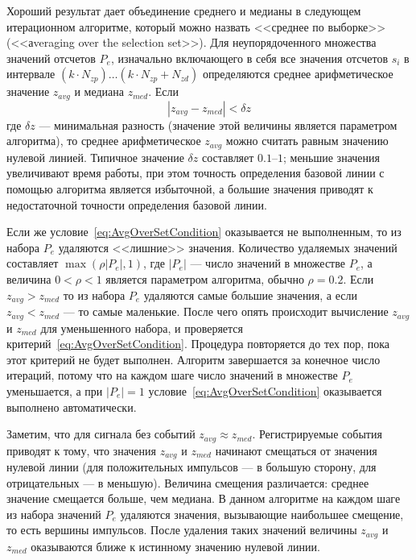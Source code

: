 Хороший результат дает объединение среднего и медианы в следующем итерационном алгоритме, который можно назвать <<среднее по выборке>> (<<аveraging over the selection set>>). Для неупорядоченного множества значений отсчетов $P_e$, изначально включающего в себя все значения отсчетов $s_i$ в интервале $(k \cdot N_{zp}) \ldots (k \cdot N_{zp} + N_{zd})$ определяются среднее арифметическое значение $z_{avg}$ и медиана $z_{med}$. Если 
\begin{equation}
  \label{eq:AvgOverSetCondition}
  | z_{avg} - z_{med} | < \delta z
\end{equation}
где $\delta z$ --- минимальная разность (значение этой величины является параметром алгоритма), то среднее арифметическое $z_{avg}$ можно считать равным значению нулевой линией. Типичное значение $\delta z$ составляет $0.1$--$1$; меньшие значения увеличивают время работы, при этом точность определения базовой линии с помощью алгоритма является избыточной, а большие значения приводят к недостаточной точности определения базовой линии. 

Если же условие~\ref{eq:AvgOverSetCondition} оказывается не выполненным, то из набора $P_e$ удаляются <<лишние>> значения. Количество удаляемых значений составляет $\max( \rho |P_e|, 1 )$, где $|P_e|$ --- число значений в множестве $P_e$, а величина $0 < \rho < 1$ является параметром алгоритма, обычно $\rho = 0.2$. Если $z_{avg} > z_{med}$ то из набора $P_e$ удаляются самые большие значения, а если  $z_{avg} < z_{med}$ --- то самые маленькие. После чего опять происходит вычисление $z_{avg}$ и $z_{med}$ для уменьшенного набора, и проверяется критерий~\ref{eq:AvgOverSetCondition}. Процедура повторяется до тех пор, пока этот критерий не будет выполнен. Алгоритм завершается за конечное число итераций, потому что на каждом шаге число значений в множестве $P_e$ уменьшается, а при $|P_e| = 1$ условие~\ref{eq:AvgOverSetCondition} оказывается выполнено автоматически. \cite{Khilkevitch2020}

Заметим, что для сигнала без событий $z_{avg} \approx z_{med}$. Регистрируемые события приводят к тому, что значения $z_{avg}$ и $z_{med}$ начинают смещаться от значения нулевой линии (для положительных импульсов --- в большую сторону, для отрицательных --- в меньшую). Величина смещения различается: среднее значение смещается больше, чем медиана. В данном алгоритме на каждом шаге из набора значений $P_e$ удаляются значения, вызывающие наибольшее смещение, то есть вершины импульсов. После удаления таких значений величины $z_{avg}$ и $z_{med}$ оказываются ближе к истинному значению нулевой линии. 

